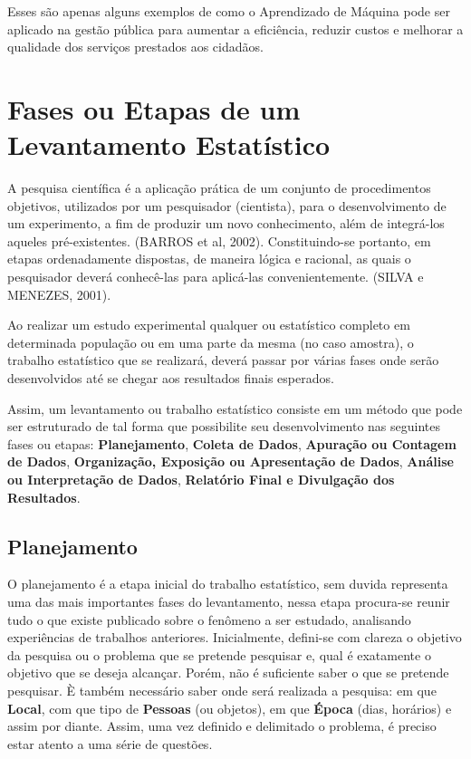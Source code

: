 Esses são apenas alguns exemplos de como o Aprendizado de Máquina pode ser aplicado na gestão pública para aumentar a eficiência, reduzir custos e melhorar a qualidade dos serviços prestados aos cidadãos.


\newpage
\section{Fases ou Etapas de um Levantamento Estatístico}

A pesquisa científica é a aplicação prática de um conjunto de procedimentos objetivos, utilizados por um pesquisador (cientista), para o desenvolvimento de um experimento, a fim de produzir um novo conhecimento, além de integrá-los aqueles pré-existentes. (BARROS et al, 2002). Constituindo-se portanto, em etapas ordenadamente dispostas, de maneira lógica e racional, as quais o pesquisador deverá conhecê-las para aplicá-las convenientemente. (SILVA e MENEZES, 2001). 
\vskip0.3cm


Ao realizar um estudo experimental qualquer ou estatístico completo em determinada população ou em uma parte da mesma (no caso amostra), o trabalho estatístico que se realizará, deverá passar por várias fases onde serão desenvolvidos até se chegar aos resultados finais esperados.\vskip0.3cm

Assim, um levantamento ou trabalho estatístico consiste em um método que pode ser estruturado de tal forma que possibilite seu desenvolvimento nas se\-guintes fases ou etapas: \textbf{Planejamento}, \textbf{Coleta de Dados}, \textbf{Apuração ou Contagem de Dados}, \textbf{Organização, Exposição ou Apresentação de Dados}, \textbf{Análise ou Interpretação de Dados}, \textbf{Relatório Final e Divulgação dos Resultados}.


\subsection{Planejamento}

O planejamento é a etapa inicial do trabalho estatístico, sem duvida representa uma das mais importantes fases do levantamento, nessa etapa procura-se reunir tudo o que existe publicado sobre o fe\-nô\-me\-no a ser estudado, analisando experiências de trabalhos anteriores. Inicialmente, defini-se com clareza o objetivo da pesquisa ou o problema que se pretende pesquisar e, qual é exatamente o objetivo que se deseja alcançar. Porém, não é suficiente saber o que se pretende pesquisar. È também necessário saber onde será realizada a pesquisa: em que \textbf{Local}, com que tipo de \textbf{Pessoas} (ou objetos), em que \textbf{Época} (dias, horários) e assim por diante. Assim, uma vez definido e delimitado o problema, é preciso estar atento a uma série de questões.\vskip0.3cm


